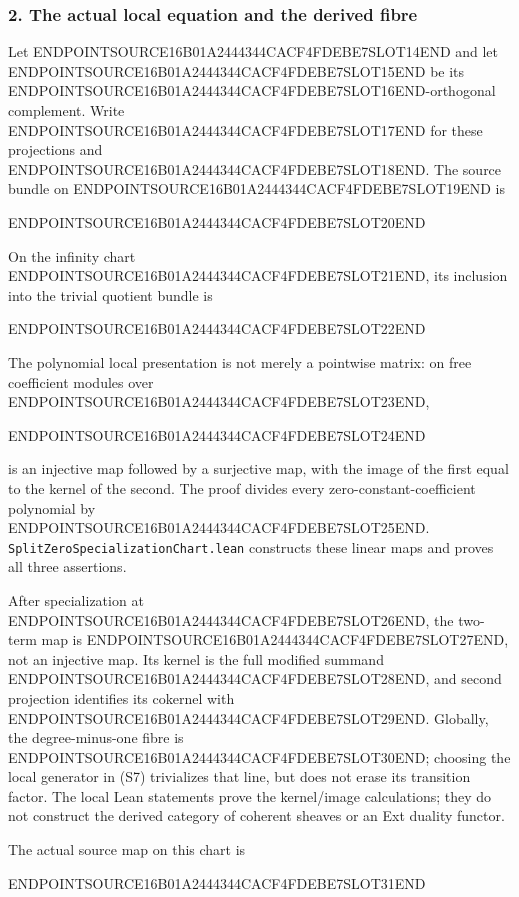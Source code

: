 \subsubsection{2. The actual local equation and the derived fibre}\label{endpoint-cc_specialization--the-actual-local-equation-and-the-derived-fibre}

Let ENDPOINTSOURCE16B01A2444344CACF4FDEBE7SLOT14END and let ENDPOINTSOURCE16B01A2444344CACF4FDEBE7SLOT15END be its ENDPOINTSOURCE16B01A2444344CACF4FDEBE7SLOT16END-orthogonal complement. Write ENDPOINTSOURCE16B01A2444344CACF4FDEBE7SLOT17END for these projections and ENDPOINTSOURCE16B01A2444344CACF4FDEBE7SLOT18END. The source bundle on ENDPOINTSOURCE16B01A2444344CACF4FDEBE7SLOT19END is

ENDPOINTSOURCE16B01A2444344CACF4FDEBE7SLOT20END

On the infinity chart ENDPOINTSOURCE16B01A2444344CACF4FDEBE7SLOT21END, its inclusion into the trivial quotient bundle is

ENDPOINTSOURCE16B01A2444344CACF4FDEBE7SLOT22END

The polynomial local presentation is not merely a pointwise matrix: on free coefficient modules over ENDPOINTSOURCE16B01A2444344CACF4FDEBE7SLOT23END,

ENDPOINTSOURCE16B01A2444344CACF4FDEBE7SLOT24END

is an injective map followed by a surjective map, with the image of the first equal to the kernel of the second. The proof divides every zero-constant-coefficient polynomial by ENDPOINTSOURCE16B01A2444344CACF4FDEBE7SLOT25END. \texttt{SplitZeroSpecializationChart.lean} constructs these linear maps and proves all three assertions.

After specialization at ENDPOINTSOURCE16B01A2444344CACF4FDEBE7SLOT26END, the two-term map is ENDPOINTSOURCE16B01A2444344CACF4FDEBE7SLOT27END, not an injective map. Its kernel is the full modified summand ENDPOINTSOURCE16B01A2444344CACF4FDEBE7SLOT28END, and second projection identifies its cokernel with ENDPOINTSOURCE16B01A2444344CACF4FDEBE7SLOT29END. Globally, the degree-minus-one fibre is ENDPOINTSOURCE16B01A2444344CACF4FDEBE7SLOT30END; choosing the local generator in (S7) trivializes that line, but does not erase its transition factor. The local Lean statements prove the kernel/image calculations; they do not construct the derived category of coherent sheaves or an Ext duality functor.

The actual source map on this chart is

ENDPOINTSOURCE16B01A2444344CACF4FDEBE7SLOT31END

